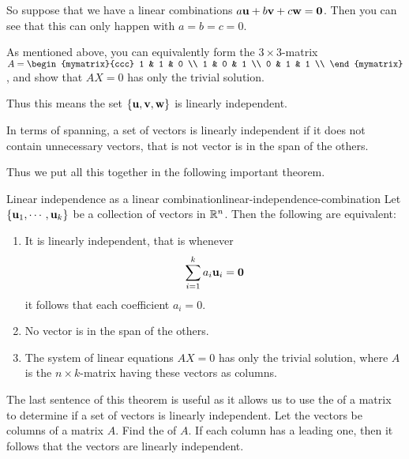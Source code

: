 \begin{solution}
So suppose that we have a linear combinations $a\mbox{\bf u} + b \mbox{\bf v}
+ c\mbox{\bf w} = \mbox{\bf 0}$. Then you can see that this can only happen
with $a=b=c=0$.

As mentioned above, you can equivalently form the $3 \times 3$-matrix $A = 
\begin{mymatrix}{ccc}
1  & 1 & 0 \\
1  & 0 & 1 \\
0  & 1 & 1 \\
\end{mymatrix}$, and show that $AX=0$ has only the trivial solution.

Thus this  means the set $\left\{\mbox{\bf u}, \mbox{\bf v}, \mbox{\bf w} \right\}$ is linearly independent. 
\end{solution}

In terms of spanning, a set of vectors is linearly independent if it
does not contain unnecessary vectors, that is not vector is in the span of the others.

Thus we put all this together in the following important theorem.

\begin{theorem}{Linear independence as a linear combination}{linear-independence-combination}
Let $\left\{\mbox{\bf u}_{1},\cdots ,\mbox{\bf u}_{k}\right\}$ be a collection of vectors  in
$\mathbb{R}^{n}$. Then the following are equivalent:

\begin{enumerate}
\item It is linearly independent, that is whenever
\begin{equation*}
\sum_{i=1}^{k}a_{i}\mbox{\bf u}_{i}=\mbox{\bf 0}
\end{equation*}
it follows that each coefficient $a_{i}=0$.
\item No vector is in the span of the others.
\item The system of
linear equations $AX=0$ has only the trivial solution, where $A$ is
the $n \times k$-matrix having these vectors as columns. 
\end{enumerate}
\end{theorem}

The last sentence of this theorem is useful as it allows us to use the
{\rref} of a matrix to determine if a set of vectors is linearly
independent. Let the vectors be columns of a matrix $A$. Find the
{\rref} of $A$. If each column has a leading one, then it follows
that the vectors are linearly independent.

